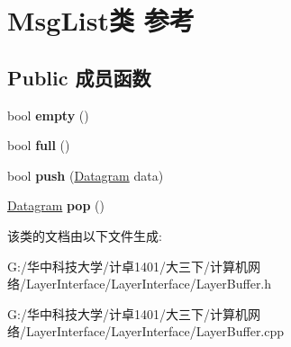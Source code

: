 \hypertarget{class_msg_list}{}\section{Msg\+List类 参考}
\label{class_msg_list}
\subsection*{Public 成员函数}
\begin{DoxyCompactItemize}
\item 
\mbox{\label{class_msg_list_a04cda4a2294100a9f56b7957e29ef40c}} 
bool {\bfseries empty} ()
\item 
\mbox{\label{class_msg_list_abd998216b6c6566b0f06ab03806104aa}} 
bool {\bfseries full} ()
\item 
\mbox{\label{class_msg_list_addbf007ab42e18737a91928e9d8efb84}} 
bool {\bfseries push} (\hyperlink{class_datagram}{Datagram} data)
\item 
\mbox{\label{class_msg_list_ac5ceb41e509380bbdb449098de3da0fb}} 
\hyperlink{class_datagram}{Datagram} {\bfseries pop} ()
\end{DoxyCompactItemize}


该类的文档由以下文件生成\+:\begin{DoxyCompactItemize}
\item 
G\+:/华中科技大学/计卓1401/大三下/计算机网络/\+Layer\+Interface/\+Layer\+Interface/Layer\+Buffer.\+h\item 
G\+:/华中科技大学/计卓1401/大三下/计算机网络/\+Layer\+Interface/\+Layer\+Interface/Layer\+Buffer.\+cpp\end{DoxyCompactItemize}
